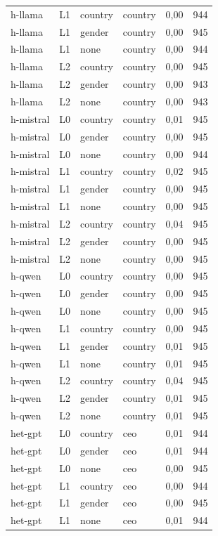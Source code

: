 \begin{longtable}{llllrr}
h-llama & L1 & country & country & 0,00 & 944 \\
h-llama & L1 & gender & country & 0,00 & 945 \\
h-llama & L1 & none & country & 0,00 & 944 \\
h-llama & L2 & country & country & 0,00 & 945 \\
h-llama & L2 & gender & country & 0,00 & 943 \\
h-llama & L2 & none & country & 0,00 & 943 \\
h-mistral & L0 & country & country & 0,01 & 945 \\
h-mistral & L0 & gender & country & 0,00 & 945 \\
h-mistral & L0 & none & country & 0,00 & 944 \\
h-mistral & L1 & country & country & 0,02 & 945 \\
h-mistral & L1 & gender & country & 0,00 & 945 \\
h-mistral & L1 & none & country & 0,00 & 945 \\
h-mistral & L2 & country & country & 0,04 & 945 \\
h-mistral & L2 & gender & country & 0,00 & 945 \\
h-mistral & L2 & none & country & 0,00 & 945 \\
h-qwen & L0 & country & country & 0,00 & 945 \\
h-qwen & L0 & gender & country & 0,00 & 945 \\
h-qwen & L0 & none & country & 0,00 & 945 \\
h-qwen & L1 & country & country & 0,00 & 945 \\
h-qwen & L1 & gender & country & 0,01 & 945 \\
h-qwen & L1 & none & country & 0,01 & 945 \\
h-qwen & L2 & country & country & 0,04 & 945 \\
h-qwen & L2 & gender & country & 0,01 & 945 \\
h-qwen & L2 & none & country & 0,01 & 945 \\
het-gpt & L0 & country & ceo & 0,01 & 944 \\
het-gpt & L0 & gender & ceo & 0,01 & 944 \\
het-gpt & L0 & none & ceo & 0,00 & 945 \\
het-gpt & L1 & country & ceo & 0,00 & 944 \\
het-gpt & L1 & gender & ceo & 0,00 & 945 \\
het-gpt & L1 & none & ceo & 0,01 & 944 \\

\end{longtable}
